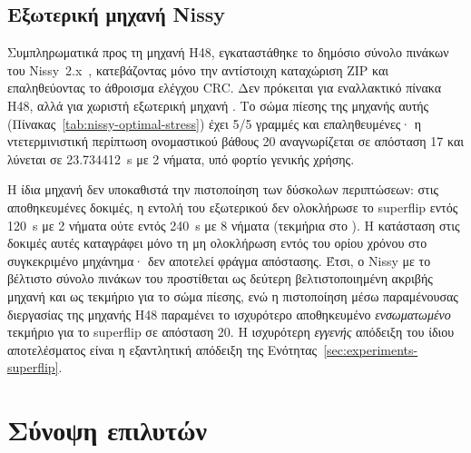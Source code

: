 \subsection{Εξωτερική μηχανή Nissy}
\label{sec:experiments-h48-nissy}

Συμπληρωματικά προς τη μηχανή H48, εγκαταστάθηκε το δημόσιο σύνολο πινάκων  του Nissy~2.x~\cite{trontoNissyCoreH48}, κατεβάζοντας μόνο την αντίστοιχη καταχώριση ZIP και επαληθεύοντας το άθροισμα ελέγχου CRC. Δεν πρόκειται για εναλλακτικό πίνακα H48, αλλά για χωριστή εξωτερική μηχανή . Το σώμα πίεσης της μηχανής αυτής (Πίνακας~\ref{tab:nissy-optimal-stress}) έχει 5/5 γραμμές  και επαληθευμένες· η ντετερμινιστική περίπτωση ονομαστικού βάθους 20 αναγνωρίζεται σε απόσταση 17 και λύνεται σε 23.734412~s με 2 νήματα, υπό φορτίο γενικής χρήσης.

Η ίδια μηχανή δεν υποκαθιστά την πιστοποίηση των δύσκολων περιπτώσεων: στις αποθηκευμένες δοκιμές, η εντολή  του εξωτερικού  δεν ολοκλήρωσε το superflip εντός 120~s με 2 νήματα ούτε εντός 240~s με 8 νήματα (τεκμήρια στο ). Η κατάσταση  στις δοκιμές αυτές καταγράφει μόνο τη μη ολοκλήρωση εντός του ορίου χρόνου στο συγκεκριμένο μηχάνημα· δεν αποτελεί φράγμα απόστασης. Έτσι, ο Nissy με το βέλτιστο σύνολο πινάκων του προστίθεται ως δεύτερη βελτιστοποιημένη ακριβής μηχανή και ως τεκμήριο για το σώμα πίεσης, ενώ η πιστοποίηση μέσω παραμένουσας διεργασίας της μηχανής H48 παραμένει το ισχυρότερο αποθηκευμένο \emph{ενσωματωμένο} τεκμήριο για το superflip σε απόσταση 20. Η ισχυρότερη \emph{εγγενής} απόδειξη του ίδιου αποτελέσματος είναι η εξαντλητική απόδειξη της Ενότητας~\ref{sec:experiments-superflip}.

\begin{table}[htbp]\centering

\caption[Σώμα πίεσης της εξωτερικής μηχανής Nissy]{Σώμα πίεσης της εξωτερικής μηχανής  με το δημόσιο σύνολο πινάκων : 5/5 γραμμές , με 2 νήματα. Πηγή: τεκμήριο του  με μηχανή .}
\label{tab:nissy-optimal-stress}
\end{table}

\section{Σύνοψη επιλυτών}
\label{sec:experiments-summary}

